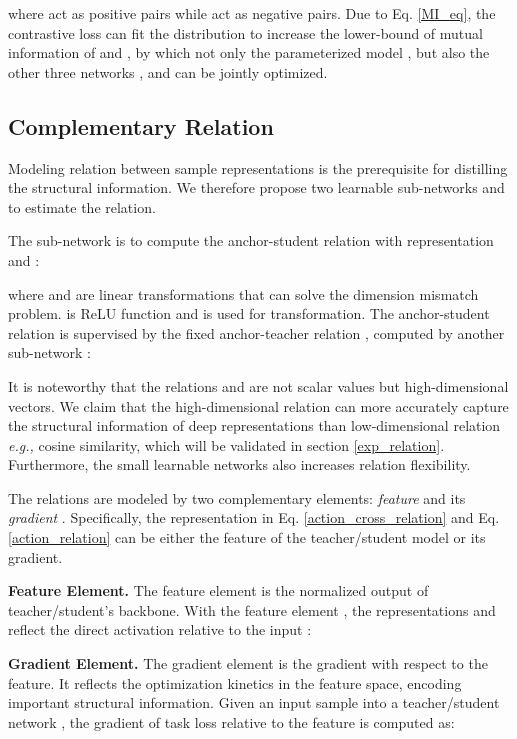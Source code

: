 \documentclass[final]{cvpr}
\begin{document}
where  act as positive pairs while  act as negative pairs. Due to Eq. \ref{MI_eq}, the contrastive loss can fit the distribution  to increase the lower-bound of mutual information of  and , by which not only the parameterized model , but also the other three networks ,  and  can be jointly optimized.




\subsection{Complementary Relation}
 Modeling relation between sample representations is the prerequisite for distilling the structural information. We therefore propose two learnable sub-networks  and  to estimate the relation. 

The sub-network  is to compute the anchor-student relation with representation   and :

where  and  are linear transformations that can solve the dimension mismatch problem.  is ReLU function and  is used for transformation. The anchor-student relation is supervised by the fixed anchor-teacher relation , computed by another sub-network :

It is noteworthy that the relations  and   are not scalar values but high-dimensional vectors. We claim that the high-dimensional relation can more accurately capture the structural information of deep representations than low-dimensional relation \emph{e.g.,} cosine similarity,
which will be validated in section \ref{exp_relation}.
Furthermore, the small learnable networks also increases relation flexibility.


The relations are modeled by two complementary elements: \textit{feature}  and its \textit{gradient} .
Specifically, the representation  in Eq.  \ref{action_cross_relation} and Eq.  \ref{action_relation} can be either the feature of the teacher/student model or its gradient.

\noindent \textbf{Feature Element.}
The feature element is the  normalized output of teacher/student's backbone. With the feature element , the representations  and  reflect the direct activation relative to the input :


\noindent \textbf{Gradient Element.}
The gradient element is the gradient with respect to the feature. It reflects the optimization kinetics in the feature space, encoding important structural information. Given an input sample  into a teacher/student network , the gradient of task loss  relative to the feature  is computed as:
\end{document}
